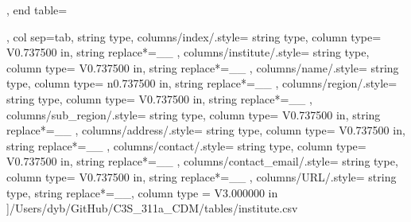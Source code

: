\begin{landscape}
\begin{longtable}
{{            \endlastfoot
        }
    },
    end table=\end{longtable},
    col sep=tab,
    string type,
    columns/index/.style={
            string type, 
            column type= V{0.737500 in}, 
            string replace*={_}{\_}
        },
    columns/institute/.style={
            string type, 
            column type= V{0.737500 in}, 
            string replace*={_}{\_}
        },
    columns/name/.style={
            string type, 
            column type= n{0.737500 in}, 
            string replace*={_}{\_}
        },
    columns/region/.style={
            string type, 
            column type= V{0.737500 in}, 
            string replace*={_}{\_}
        },
    columns/sub_region/.style={
            string type, 
            column type= V{0.737500 in}, 
            string replace*={_}{\_}
        },
    columns/address/.style={
            string type, 
            column type= V{0.737500 in}, 
            string replace*={_}{\_}
        },
    columns/contact/.style={
            string type, 
            column type= V{0.737500 in}, 
            string replace*={_}{\_}
        },
    columns/contact_email/.style={
            string type, 
            column type= V{0.737500 in}, 
            string replace*={_}{\_}
        },
    columns/URL/.style={
            string type, 
            string replace*={_}{\_},
            column type = V{3.000000 in}
        }
    ]{/Users/dyb/GitHub/C3S_311a_CDM/tables/institute.csv}
\end{landscape}
